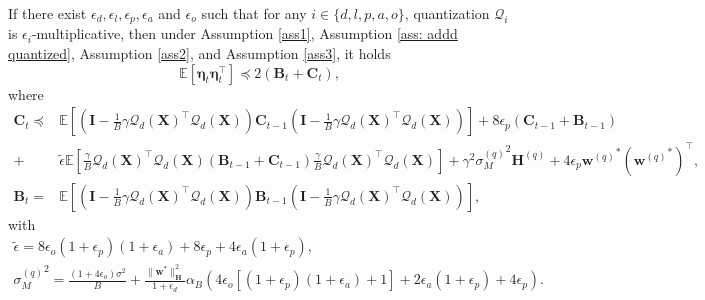 \documentclass[11pt, letterpaper]{article}
\begin{document}
\begin{lemma}
    \label{update rule for eta_t^2 multiplicative, master}
    If there exist $\epsilon_d,\epsilon_l,\epsilon_p,\epsilon_a$ and $\epsilon_o$ such that for any $i\in \{d,l,p,a,o\}$, quantization $\mathcal{Q}_i$ is $\epsilon_i$-multiplicative, then under Assumption \ref{ass1}, Assumption \ref{ass: addd quantized}, Assumption \ref{ass2}, and Assumption \ref{ass3}, it holds
    \begin{equation*}
        \mathbb{E}\left[\boldsymbol{\eta}_t\boldsymbol{\eta}_t^\top\right]\preceq 2(\mathbf{B}_t+\mathbf{C}_t),
    \end{equation*}
    where
    \begin{equation*}
        \begin{aligned}
            \mathbf{C}_t
            \preceq&\mathbb{E}\left[\left(\mathbf{I}-\frac{1}{B}\gamma {\mathcal{Q}_d(\mathbf{X})}^\top \mathcal{Q}_d(\mathbf{X}) \right)\mathbf{C}_{t-1}\left(\mathbf{I}-\frac{1}{B}\gamma {\mathcal{Q}_d(\mathbf{X})}^\top \mathcal{Q}_d(\mathbf{X}) \right)\right]+8\epsilon_p\left(\mathbf{C}_{t-1}+\mathbf{B}_{t-1}\right)\\
            +&\tilde{\epsilon}\mathbb{E}\left[\frac{\gamma}{B}{\mathcal{Q}_d(\mathbf{X})}^\top {\mathcal{Q}_d(\mathbf{X})}(\mathbf{B}_{t-1}+\mathbf{C}_{t-1})\frac{\gamma}{B}{\mathcal{Q}_d(\mathbf{X})}^\top\mathcal{Q}_d(\mathbf{X})\right]
            +\gamma^2 {\sigma_M^{(q)}}^2\mathbf{H}^{(q)}+4\epsilon_p{\mathbf{w}^{(q)}}^*({\mathbf{w}^{(q)}}^*)^\top,\\
            \mathbf{B}_t=& \mathbb{E}\left[\left(\mathbf{I}-\frac{1}{B}\gamma {\mathcal{Q}_d(\mathbf{X})}^\top \mathcal{Q}_d(\mathbf{X}) \right)\mathbf{B}_{t-1}\left(\mathbf{I}-\frac{1}{B}\gamma {\mathcal{Q}_d(\mathbf{X})}^\top \mathcal{Q}_d(\mathbf{X}) \right)\right],
        \end{aligned}
    \end{equation*}
    with
    \begin{gather*}
            \tilde{\epsilon}=8\epsilon_o(1+\epsilon_p)(1+\epsilon_a)+8\epsilon_p+4\epsilon_a(1+\epsilon_p),\\
            {\sigma_M^{(q)}}^2=\frac{(1+4\epsilon_o)\sigma^2}{B} + \frac{\|\mathbf{w}^*\|_\mathbf{H}^2}{1+\epsilon_d}\alpha_B\left(4\epsilon_o[(1+\epsilon_p)(1+\epsilon_a)+1]+2\epsilon_a(1+\epsilon_p)+4\epsilon_p \right).
    \end{gather*}
\end{lemma}
\end{document}
